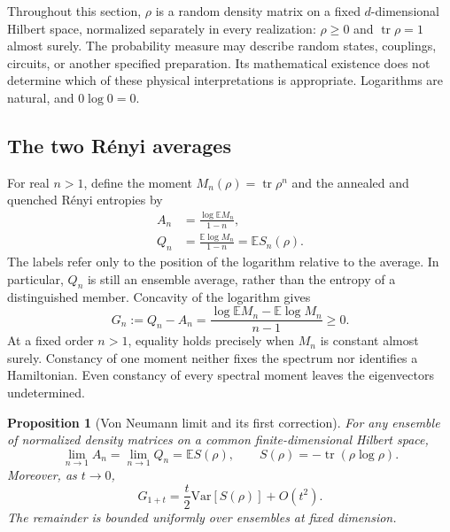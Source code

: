 \documentclass[11pt,letterpaper]{article}
\theoremstyle{plain}
\newtheorem{proposition}[theorem]{Proposition}
\theoremstyle{definition}
\theoremstyle{remark}
\newcommand{\E}{\mathbb{E}}
\newcommand{\Var}{\text{Var}}
\DeclareMathOperator{\tr}{tr}
\begin{document}
Throughout this section, $\rho$ is a random density matrix on a fixed
$d$-dimensional Hilbert space, normalized separately in every realization:
$\rho\geq0$ and $\tr\rho=1$ almost surely.  The probability measure may
describe random states, couplings, circuits, or another specified
preparation.  Its mathematical existence does not determine which of
these physical interpretations is appropriate.  Logarithms are natural,
and $0\log0=0$.

\subsection{The two R\'enyi averages}
\label{subsec12:why_matters}

For real $n>1$, define the moment $M_n(\rho)=\tr\rho^n$ and the
annealed and quenched R\'enyi entropies by
\begin{align}
 A_n&=\frac{\log\E M_n}{1-n},
 \label{eq12:annealed_def}\\
 Q_n&=\frac{\E\log M_n}{1-n}=\E S_n(\rho).
 \label{eq12:quenched_def}
\end{align}
The labels refer only to the position of the logarithm relative to the
average.  In particular, $Q_n$ is still an ensemble average, rather than
the entropy of a distinguished member.  Concavity of the logarithm gives
\begin{equation}
 G_n:=Q_n-A_n
 =\frac{\log\E M_n-\E\log M_n}{n-1}\geq0.
 \label{eq12:gap_def}
\end{equation}
At a fixed order $n>1$, equality holds precisely when $M_n$ is constant
almost surely.  Constancy of one moment neither fixes the spectrum nor
identifies a Hamiltonian.  Even constancy of every spectral moment leaves
the eigenvectors undetermined.

\begin{proposition}[Von Neumann limit and its first correction]
\label{prop12:von_neumann_limit}
For any ensemble of normalized density matrices on a common
finite-dimensional Hilbert space,
\begin{equation}
 \lim_{n\to1}A_n=\lim_{n\to1}Q_n=\E S(\rho),
 \qquad S(\rho)=-\tr(\rho\log\rho).
 \label{eq12:common_limit}
\end{equation}
Moreover, as $t\to0$,
\begin{equation}
 G_{1+t}=\frac{t}{2}\Var[S(\rho)]+O(t^2).
 \label{eq12:gap_formula}
\end{equation}
The remainder is bounded uniformly over ensembles at fixed dimension.
\end{proposition}
\end{document}

